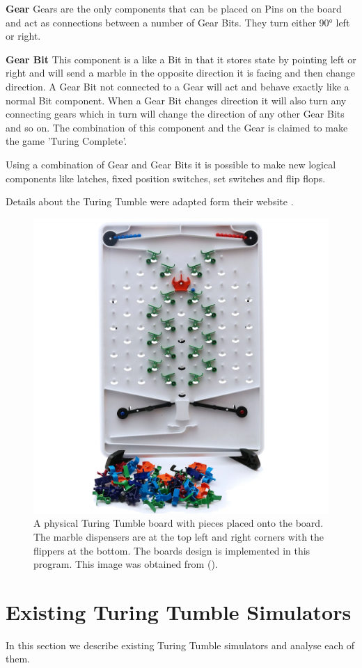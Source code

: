 \documentclass{l4proj}
\begin{document}
\textbf{Gear}
Gears are the only components that can be placed on Pins on the board and act as connections between a number of Gear Bits. They turn either 90° left or right. 

\textbf{Gear Bit}
This component is a like a Bit in that it stores state by pointing left or right and will send a marble in the opposite direction it is facing and then change direction. A Gear Bit not connected to a Gear will act and behave exactly like a normal Bit component. When a Gear Bit changes direction it will also turn any connecting gears which in turn will change the direction of any other Gear Bits and so on. The combination of this component and the Gear is claimed to make the game 'Turing Complete'.

Using a combination of Gear and Gear Bits it is possible to make new logical components like latches, fixed position switches, set switches and flip flops.

Details about the Turing Tumble were adapted form their website \citep{turing_tumble_site}.

\begin{figure}
    \centering
    \includegraphics[width=0.5\linewidth]{images/turingTumbleBoard.png}
    \caption{A physical Turing Tumble board with pieces placed onto the board. The marble dispensers are at the top left and right corners with the flippers at the bottom. The boards design is implemented in this program. This image was obtained from (\cite{turing_tumble_picture}).}
    \label{fig:ttboard}
\end{figure}


\section{Existing Turing Tumble Simulators}
In this section we describe existing Turing Tumble simulators and analyse each of them.
\end{document}
